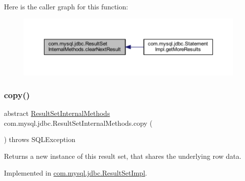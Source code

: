 Here is the caller graph for this function\+:
\nopagebreak
\begin{figure}[H]
\begin{center}
\leavevmode
\includegraphics[width=350pt]{interfacecom_1_1mysql_1_1jdbc_1_1_result_set_internal_methods_abda1557c737e5ac6762d58e43fae2195_icgraph}
\end{center}
\end{figure}
\mbox{\label{interfacecom_1_1mysql_1_1jdbc_1_1_result_set_internal_methods_aa9fcef476bda66d0c230ef68931a44cf}} 
\subsubsection{\texorpdfstring{copy()}{copy()}}
{\footnotesize\ttfamily abstract \mbox{\hyperlink{interfacecom_1_1mysql_1_1jdbc_1_1_result_set_internal_methods}{Result\+Set\+Internal\+Methods}} com.\+mysql.\+jdbc.\+Result\+Set\+Internal\+Methods.\+copy (\begin{DoxyParamCaption}{ }\end{DoxyParamCaption}) throws S\+Q\+L\+Exception\hspace{0.3cm}{\ttfamily [abstract]}}

Returns a new instance of this result set, that shares the underlying row data. 

Implemented in \mbox{\hyperlink{classcom_1_1mysql_1_1jdbc_1_1_result_set_impl_a4f2a8d2b18832126779e992109371a59}{com.\+mysql.\+jdbc.\+Result\+Set\+Impl}}.

\mbox{\label{interfacecom_1_1mysql_1_1jdbc_1_1_result_set_internal_methods_ad7091c487cd2a0ad8550ed98e489e535}} 
